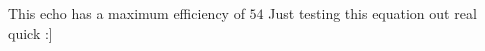                                                                                                                                       





This echo has a maximum efficiency of $54$
 %
Just testing this equation out real quick :] 






